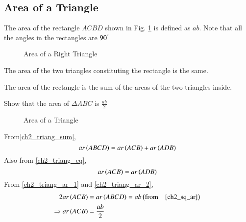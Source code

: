 \subsection{Area of a Triangle}



\begin{definition}
	The area of the rectangle $ACBD$ shown in Fig. \ref{ch2_sq_ar} is defined as $ab$. Note that all the angles in the rectangles are $90^{\degree}$
	\label{ch2_sq_ar}
\end{definition}
\begin{figure}[!h]
	\begin{center}
		
		\resizebox{\columnwidth}{!}{}
	\end{center}
	\caption{Area of a Right Triangle}
	\label{ch2_sq_ar}	
\end{figure}

\begin{definition}
	The area of the two triangles constituting the rectangle is the same.
	\label{ch2_triang_eq}
\end{definition}
\begin{definition}
	The area of the rectangle is the sum of the areas of the two triangles inside.
	\label{ch2_triang_sum}
\end{definition}

\begin{problem}
	Show that the area of $\Delta ABC$ is $\frac{ab}{2}$
\end{problem}
\begin{figure}[!h]
	\begin{center}
		
		\resizebox{\columnwidth}{!}{}
	\end{center}
	\caption{Area of a Triangle}
	\label{ch2_triang_ar}	
\end{figure}

\proof From\eqref{ch2_triang_sum},
\begin{equation}
\label{ch2_triang_ar_1}
ar\left(ABCD\right) = ar\left(ACB\right) + ar\left(ADB\right)
\end{equation}
Also from \eqref{ch2_triang_eq},
\begin{equation}
\label{ch2_triang_ar_2}
ar\left(ACB\right) = ar\left(ADB\right)
\end{equation}
From \eqref{ch2_triang_ar_1} and \eqref{ch2_triang_ar_2},
\begin{align}
2ar\left(ACB\right) &= ar\left(ABCD\right) = ab \left(\text{from} \quad \eqref{ch2_sq_ar}\right)
\\
\Rightarrow ar\left(ACB\right) &= \frac{ab}{2}
\end{align}

